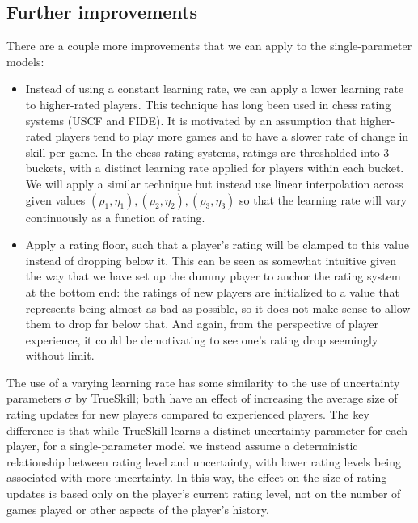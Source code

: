 \documentclass{article}
\begin{document}
	\subsection{Further improvements}
	There are a couple more improvements that we can apply to the single-parameter models:
	\begin{itemize}
		\item Instead of using a constant learning rate, we can apply a lower learning rate to higher-rated players. This technique has long been used in chess rating systems (USCF and FIDE). It is motivated by an assumption that higher-rated players tend to play more games and to have a slower rate of change in skill per game. In the chess rating systems, ratings are thresholded into 3 buckets, with a distinct learning rate applied for players within each bucket. We will apply a similar technique but instead use linear interpolation across given values $(\rho_1, \eta_1), (\rho_2, \eta_2), (\rho_3, \eta_3)$ so that the learning rate will vary continuously as a function of rating.
		\item Apply a rating floor, such that a player's rating will be clamped to this value instead of dropping below it. This can be seen as somewhat intuitive given the way that we have set up the dummy player to anchor the rating system at the bottom end: the ratings of new players are initialized to a value that represents being almost as bad as possible, so it does not make sense to allow them to drop far below that. And again, from the perspective of player experience, it could be demotivating to see one's rating drop seemingly without limit.
	\end{itemize}
	
	The use of a varying learning rate has some similarity to the use of uncertainty parameters $\sigma$ by TrueSkill; both have an effect of increasing the average size of rating updates for new players compared to experienced players. The key difference is that while TrueSkill learns a distinct uncertainty parameter for each player, for a single-parameter model we instead assume a deterministic relationship between rating level and uncertainty, with lower rating levels being associated with more uncertainty. In this way, the effect on the size of rating updates is based only on the player's current rating level, not on the number of games played or other aspects of the player's history.
	
\end{document}
